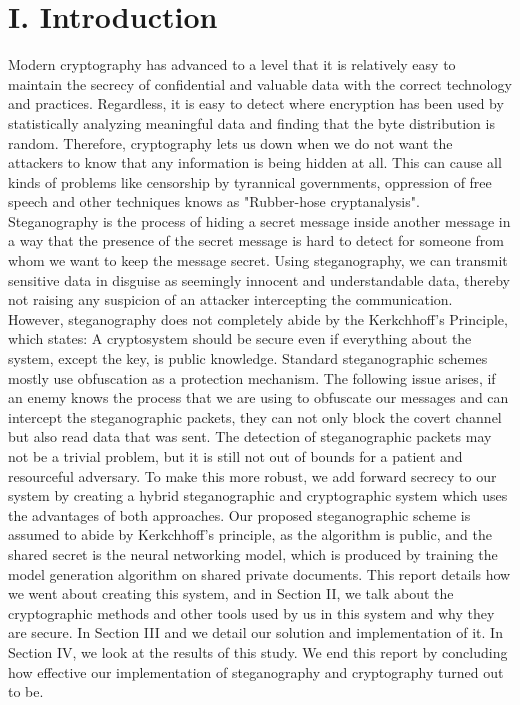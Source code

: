 \documentclass[12pt]{article}
\begin{document}
\section*{I. Introduction}
Modern cryptography has advanced to a level that it is relatively easy to maintain the secrecy of confidential and valuable data with the correct technology and practices. Regardless, it is easy to detect where encryption has been used by statistically analyzing meaningful data and finding that the byte distribution is random. Therefore, cryptography lets us down when we do not want the attackers to know that any information is being hidden at all. This can cause all kinds of problems like censorship by tyrannical governments, oppression of free speech and other techniques knows as "Rubber-hose cryptanalysis".\\
Steganography is the process of hiding a secret message inside another message in a way that the presence of the secret message is hard to detect for someone from whom we want to keep the message secret.  Using steganography, we can transmit sensitive data in disguise as seemingly innocent and understandable data, thereby not raising any suspicion of an attacker intercepting the communication.\\
However, steganography does not completely abide by the Kerkchhoff's Principle, which states: A cryptosystem should be secure even if everything about the system, except the key, is public knowledge.
Standard steganographic schemes mostly use obfuscation as a protection mechanism. The following issue arises, if an enemy knows the process that we are using to obfuscate our messages and can intercept the steganographic packets, they can not only block the covert channel but also read data that was sent. The detection of steganographic packets may not be a trivial problem, but it is still not out of bounds for a patient and resourceful adversary. To make this more robust, we add forward secrecy to our system by creating a hybrid steganographic and cryptographic system which uses the advantages of both approaches. Our proposed steganographic scheme is assumed to abide by Kerkchhoff's principle, as the algorithm is public, and the shared secret is the neural networking model, which is produced by training the model generation algorithm on shared private documents.
This report details how we went about creating this system, and in Section II, we talk about the cryptographic methods and other tools used by us in this system and why they are secure. In Section III and we detail our solution and implementation of it. In Section IV, we look at the results of this study. We end this report by concluding how effective our implementation of steganography and cryptography turned out to be.
\end{document}
